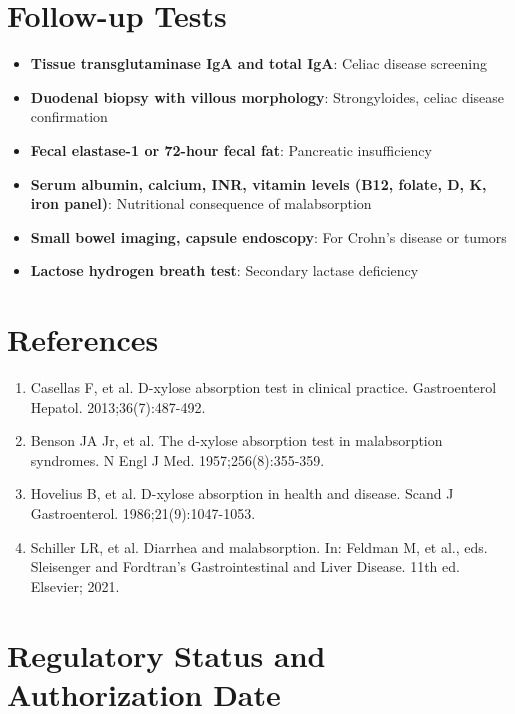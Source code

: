 \section*{Follow-up Tests}
\begin{itemize}
  \item \textbf{Tissue transglutaminase IgA and total IgA}: Celiac disease screening
  \item \textbf{Duodenal biopsy with villous morphology}: Strongyloides, celiac disease confirmation
  \item \textbf{Fecal elastase-1 or 72-hour fecal fat}: Pancreatic insufficiency
  \item \textbf{Serum albumin, calcium, INR, vitamin levels (B12, folate, D, K, iron panel)}: Nutritional consequence of malabsorption
  \item \textbf{Small bowel imaging, capsule endoscopy}: For Crohn's disease or tumors
  \item \textbf{Lactose hydrogen breath test}: Secondary lactase deficiency
\end{itemize}

\section*{References}
\begin{enumerate}
  \item Casellas F, et al. D-xylose absorption test in clinical practice. Gastroenterol Hepatol. 2013;36(7):487-492.
  \item Benson JA Jr, et al. The d-xylose absorption test in malabsorption syndromes. N Engl J Med. 1957;256(8):355-359.
  \item Hovelius B, et al. D-xylose absorption in health and disease. Scand J Gastroenterol. 1986;21(9):1047-1053.
  \item Schiller LR, et al. Diarrhea and malabsorption. In: Feldman M, et al., eds. Sleisenger and Fordtran's Gastrointestinal and Liver Disease. 11th ed. Elsevier; 2021.
\end{enumerate}

\clearpage
\section*{Regulatory Status and Authorization Date}

\clearpage
